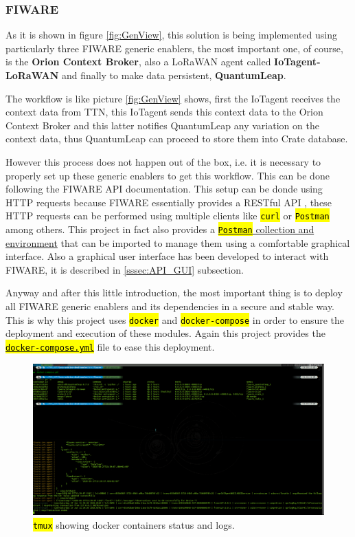 \documentclass[11pt,a4paper,dvipsnames,twoside]{article}
\newcommand{\cmd}[1] {\hl{\texttt{#1}}}
\begin{document}
\subsubsection{FIWARE}\label{sssec:FIWARE}
As it is shown in figure \ref{fig:GenView}, this solution is being implemented using particularly three FIWARE generic enablers, the most important one, of course, is the \textbf{Orion Context Broker}, also a LoRaWAN agent called \textbf{IoTagent-LoRaWAN} and finally to make data persistent, \textbf{QuantumLeap}.

The workflow is like picture \ref{fig:GenView} shows, first the IoTagent receives the context data from TTN, this IoTagent sends this context data to the Orion Context Broker and this latter notifies QuantumLeap any variation on the context data, thus QuantumLeap can proceed to store them into Crate database.

However this process does not happen out of the box, i.e. it is necessary to properly set up these generic enablers to get this workflow. This can be done following the FIWARE API documentation. This setup can be donde using HTTP requests because FIWARE essentially provides a RESTful API \cite{FIWARE_RESTful}, these HTTP requests can be performed using multiple clients like \cmd{curl} or \cmd{Postman} among others. This project in fact also provides a \href{https://github.com/WyRe/lora-arduino-dendrometer/tree/master/src/postman}{\cmd{Postman} collection and environment} that can be imported to manage them using a comfortable graphical interface. Also a graphical user interface has been developed to interact with FIWARE, it is described in \ref{sssec:API_GUI} subsection.

Anyway and after this little introduction, the most important thing is to deploy all FIWARE generic enablers and its dependencies in a secure and stable way. This is why this project uses \cmd{docker} and \cmd{docker-compose} in order to ensure the deployment and execution of these modules. Again this project provides the \href{https://github.com/WyRe/lora-arduino-dendrometer/blob/master/src/fiware/docker-compose.yml}{\cmd{docker-compose.yml}} file to ease this deployment.

\begin{figure}[ht]
  \centering
  \includegraphics[width=.9\textwidth]{../pictures/docker_containers_deployed.png}  
  \caption{\cmd{tmux} showing docker containers status and logs.}
  \label{fig:docker_containers}
\end{figure}
\end{document}
